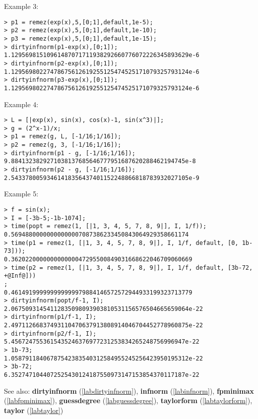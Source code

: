 \noindent Example 3: 
\begin{center}\begin{minipage}{15cm}\begin{Verbatim}[frame=single]
> p1 = remez(exp(x),5,[0;1],default,1e-5);
> p2 = remez(exp(x),5,[0;1],default,1e-10);
> p3 = remez(exp(x),5,[0;1],default,1e-15);
> dirtyinfnorm(p1-exp(x),[0;1]);
1.12956981510961487071711938292660776072226345893629e-6
> dirtyinfnorm(p2-exp(x),[0;1]);
1.12956980227478675612619255125474525171079325793124e-6
> dirtyinfnorm(p3-exp(x),[0;1]);
1.12956980227478675612619255125474525171079325793124e-6
\end{Verbatim}
\end{minipage}\end{center}
\noindent Example 4: 
\begin{center}\begin{minipage}{15cm}\begin{Verbatim}[frame=single]
> L = [|exp(x), sin(x), cos(x)-1, sin(x^3)|];
> g = (2^x-1)/x;
> p1 = remez(g, L, [-1/16;1/16]);
> p2 = remez(g, 3, [-1/16;1/16]);
> dirtyinfnorm(p1 - g, [-1/16;1/16]);
9.8841323829271038137685646777951687620288462194745e-8
> dirtyinfnorm(p2 - g, [-1/16;1/16]);
2.54337800593461418356437401152248866818783932027105e-9
\end{Verbatim}
\end{minipage}\end{center}
\noindent Example 5: 
\begin{center}\begin{minipage}{15cm}\begin{Verbatim}[frame=single]
> f = sin(x);
> I = [-3b-5;-1b-1074];
> time(popt = remez(1, [|1, 3, 4, 5, 7, 8, 9|], I, 1/f));
0.56948800000000000007087386233450843064929358661174
> time(p1 = remez(1, [|1, 3, 4, 5, 7, 8, 9|], I, 1/f, default, [0, 1b-73]));
0.362022000000000000047295500849031668622046709060669
> time(p2 = remez(1, [|1, 3, 4, 5, 7, 8, 9|], I, 1/f, default, [3b-72, +@Inf@]))
;
0.461491999999999999979884146572572944933199323713779
> dirtyinfnorm(popt/f-1, I);
2.06750931454112835098093903810531156576504665659064e-22
> dirtyinfnorm(p1/f-1, I);
2.49711266837493110470637913808914046704452778960875e-22
> dirtyinfnorm(p2/f-1, I);
5.4567247553615435246376977231253834265248756996947e-22
> 1b-73;
1.05879118406787542383540312584955245256423950195312e-22
> 3b-72;
6.3527471044072525430124187550973147153854370117187e-22
\end{Verbatim}
\end{minipage}\end{center}
See also: \textbf{dirtyinfnorm} (\ref{labdirtyinfnorm}), \textbf{infnorm} (\ref{labinfnorm}), \textbf{fpminimax} (\ref{labfpminimax}), \textbf{guessdegree} (\ref{labguessdegree}), \textbf{taylorform} (\ref{labtaylorform}), \textbf{taylor} (\ref{labtaylor})
